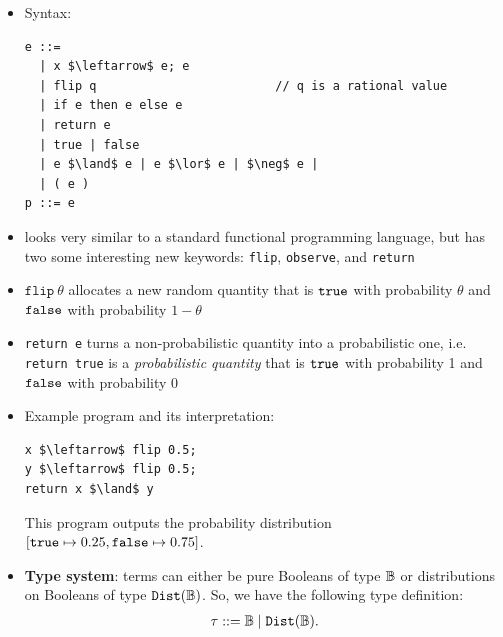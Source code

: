 \documentclass{tufte-handout}
\begin{document}
\begin{itemize}
  \item Syntax:
\begin{lstlisting}[mathescape=true]
  e ::=
  | x $\leftarrow$ e; e
  | flip q                         // q is a rational value
  | if e then e else e
  | return e
  | true | false
  | e $\land$ e | e $\lor$ e | $\neg$ e |
  | ( e )
p ::= e
\end{lstlisting}

\item \disc{} looks very similar to a standard functional programming language,
but has two some interesting new keywords: \texttt{flip}, \texttt{observe}, and
\texttt{return}

\item $\texttt{flip}~\theta$ allocates a new random quantity that is $\texttt{true}$
with probability $\theta$ and $\texttt{false}$ with probability $1-\theta$

\item \texttt{return e} turns a non-probabilistic quantity into a probabilistic one, i.e. 
\texttt{return true} is a \emph{probabilistic quantity} that is $\texttt{true}$ with probability 1 and 
$\texttt{false}$ with probability 0

\item Example program and its interpretation: 

\begin{lstlisting}[mathescape=true]
x $\leftarrow$ flip 0.5; 
y $\leftarrow$ flip 0.5;
return x $\land$ y
\end{lstlisting}

This program outputs the probability distribution $[\texttt{true} \mapsto 0.25, \texttt{false}
\mapsto 0.75]$.

\item \textbf{Type system}: terms can either be pure Booleans of type $\mathbb{B}$ 
or distributions on Booleans of type $\mathtt{Dist}(\mathbb{B})$. So, we have the following 
type definition:
\begin{align}
  \tau ::= \mathbb{B} \mid \mathtt{Dist}(\mathbb{B}).
\end{align}


\end{itemize}
\end{document}
